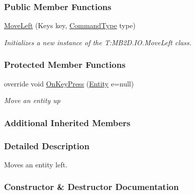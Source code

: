 \subsubsection*{Public Member Functions}
\begin{DoxyCompactItemize}
\item 
\hyperlink{class_m_b2_d_1_1_i_o_1_1_move_left_a0b3941cc163804d9ae7adfbb99815ad5}{Move\+Left} (Keys key, \hyperlink{namespace_m_b2_d_1_1_i_o_ab5f95f3fe9e652778b62bdf943168a68}{Command\+Type} type)
\begin{DoxyCompactList}\small\item\em Initializes a new instance of the T\+:\+M\+B2\+D.\+I\+O.\+Move\+Left class. \end{DoxyCompactList}\end{DoxyCompactItemize}
\subsubsection*{Protected Member Functions}
\begin{DoxyCompactItemize}
\item 
override void \hyperlink{class_m_b2_d_1_1_i_o_1_1_move_left_aa74df62134ee5fc3a5b2503114a5a7e6}{On\+Key\+Press} (\hyperlink{class_m_b2_d_1_1_entity_component_1_1_entity}{Entity} e=null)
\begin{DoxyCompactList}\small\item\em Move an entity up \end{DoxyCompactList}\end{DoxyCompactItemize}
\subsubsection*{Additional Inherited Members}


\subsubsection{Detailed Description}
Moves an entity left. 



\subsubsection{Constructor \& Destructor Documentation}
\hypertarget{class_m_b2_d_1_1_i_o_1_1_move_left_a0b3941cc163804d9ae7adfbb99815ad5}{}\label{class_m_b2_d_1_1_i_o_1_1_move_left_a0b3941cc163804d9ae7adfbb99815ad5} 
